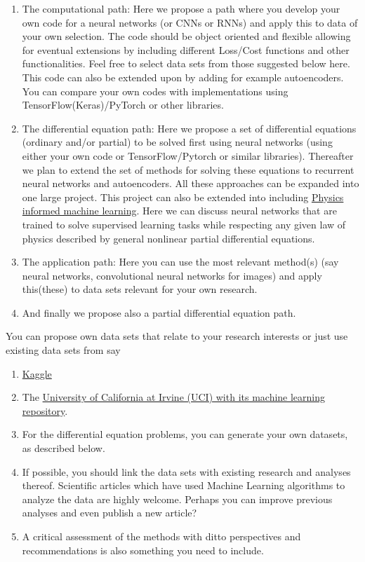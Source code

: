 \documentclass[%
oneside,                 %
final,                   %
10pt]{article}
\begin{document}
\begin{enumerate}
\item The computational path: Here we propose a path where you develop your own code for a neural networks (or CNNs or RNNs) and apply this to data  of your own selection. The code should be object oriented and flexible allowing for eventual extensions by including different Loss/Cost functions and other functionalities. Feel free to select data sets from those suggested below here. This code can also be extended upon by adding for example autoencoders. You can compare your own codes with implementations using TensorFlow(Keras)/PyTorch or other libraries.

\item The differential equation path: Here we propose a set of differential equations (ordinary and/or partial) to be solved first using neural networks (using either your own code or TensorFlow/Pytorch or similar libraries). Thereafter we plan to extend the set of methods for solving these equations to recurrent neural networks and autoencoders. All these approaches can be expanded into one large project. This project can also be extended into including \href{{https://github.com/maziarraissi/PINNs}}{Physics informed machine learning}. Here we can discuss neural networks that are trained to solve supervised learning tasks while respecting any given law of physics described by general nonlinear partial differential equations. 

\item The application path: Here you can use the most relevant method(s) (say neural networks, convolutional neural networks for images) and apply this(these) to data sets relevant for your own research.

\item And finally we propose also a partial differential equation path.
\end{enumerate}

\noindent
You can propose own data sets that relate to your research interests or just use existing data sets from say
\begin{enumerate}
\item \href{{https://www.kaggle.com/datasets}}{Kaggle} 

\item The \href{{https://archive.ics.uci.edu/ml/index.php}}{University of California at Irvine (UCI) with its  machine learning repository}.

\item For the differential equation problems, you can generate your own datasets, as described below.

\item If possible, you should link the data sets with existing research and analyses thereof. Scientific articles which have used Machine Learning algorithms to analyze the data are highly welcome. Perhaps you can improve previous analyses and even publish a new article? 

\item A critical assessment of the methods with ditto perspectives and recommendations is also something you need to include. 
\end{enumerate}
\end{document}
